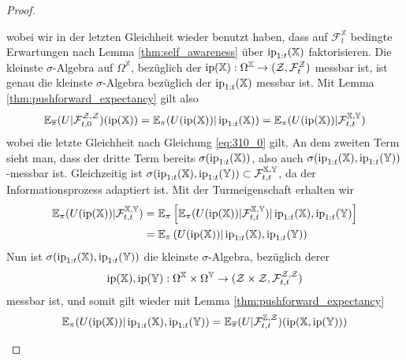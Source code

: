 \begin{proof}
\begin{enumerate}[(i)]
\begin{equation}
\end{equation}
wobei wir in der letzten Gleichheit wieder benutzt haben, dass auf $\mathcal{F}_t^\mathbb{X}$ bedingte Erwartungen nach Lemma \ref{thm:self_awareness} über $\operatorname{ip}_{1:t}(\mathbb{X})$ faktorisieren. Die kleinste $\sigma$-Algebra auf $\Omega^\mathbb{X}$, bezüglich der $\operatorname{ip}(\mathbb{X}): \Omega^{\mathbb{X}} \rightarrow (\mathcal{Z}, \mathcal{F}_t^\mathcal{Z})$ messbar ist, ist genau die kleinste $\sigma$-Algebra bezüglich der $\operatorname{ip}_{1:t}(\mathbb{X})$ messbar ist. Mit Lemma \ref{thm:pushforward_expectancy} gilt also
\begin{equation}\label{eq:310_1}
    \mathbb{E}_{\overline\pi}(U \vert \mathcal{F}_{t, 0}^{\mathcal{Z}, \mathcal{Z}})(\operatorname{ip}(\mathbb{X})) = \mathbb{E}_\pi(U(\operatorname{ip}(\mathbb{X})) \vert \operatorname{ip}_{1:t}(\mathbb{X})) = \mathbb{E}_\pi(U(\operatorname{ip}(\mathbb{X})) \vert \mathcal{F}_{t,t}^{\mathbb{X}, \mathbb{Y}})
\end{equation}
wobei die letzte Gleichheit nach Gleichung \ref{eq:310_0} gilt.
An dem zweiten Term sieht man, dass der dritte Term bereits $\sigma(\operatorname{ip}_{1:t}(\mathbb{X}))$, also auch  $\sigma(\operatorname{ip}_{1:t}(\mathbb{X}), \operatorname{ip}_{1:t}(\mathbb{Y}))$-messbar ist. Gleichzeitig ist $\sigma(\operatorname{ip}_{1:t}(\mathbb{X}), \operatorname{ip}_{1:t}(\mathbb{Y})) \subset \mathcal{F}_{t,t}^{\mathbb{X}, \mathbb{Y}}$, da der Informationsprozess adaptiert ist. Mit der Turmeigenschaft erhalten wir
\begin{align}\label{eq:310_2}
    \begin{split}
\mathbb{E}_\pi(U(\operatorname{ip}(\mathbb{X})) \vert \mathcal{F}_{t,t}^{\mathbb{X}, \mathbb{Y}}) &= \mathbb{E}_\pi\left[\mathbb{E}_\pi(U(\operatorname{ip}(\mathbb{X}))\vert \mathcal{F}_{t,t}^{\mathbb{X}, \mathbb{Y}}) \vert \operatorname{ip}_{1:t}(\mathbb{X}), \operatorname{ip}_{1:t}(\mathbb{Y})\right] \\ 
&= \mathbb{E}_\pi\left(U(\operatorname{ip}(\mathbb{X})) \vert \operatorname{ip}_{1:t}(\mathbb{X}), \operatorname{ip}_{1:t}(\mathbb{Y})\right)
    \end{split}
\end{align}
Nun ist $\sigma(\operatorname{ip}_{1:t}(\mathbb{X}), \operatorname{ip}_{1:t}(\mathbb{Y}))$ die kleinste $\sigma$-Algebra, bezüglich derer 
$$\operatorname{ip}(\mathbb{X}), \operatorname{ip}(\mathbb{Y}): \Omega^\mathbb{X} \times \Omega^\mathbb{Y} \rightarrow (\mathcal{Z}\times \mathcal{Z}, \mathcal{F}_{t,t}^{\mathcal{Z}, \mathcal{Z}})$$
messbar ist, und somit gilt wieder mit Lemma \ref{thm:pushforward_expectancy}
\begin{equation}\label{eq:310_3}
    \mathbb{E}_\pi(U(\ip(\mathbb{X})) \vert \ip_{1:t}(\mathbb{X}), \ip_{1:t}(\mathbb{Y})) = \mathbb{E}_{\overline\pi}(U \vert \mathcal{F}_{t,t}^{\mathbb{Z}, \mathcal{Z}})(\ip(\mathbb{X}, \ip(\mathbb{Y})))

\end{equation}
\end{enumerate}
\end{proof}
